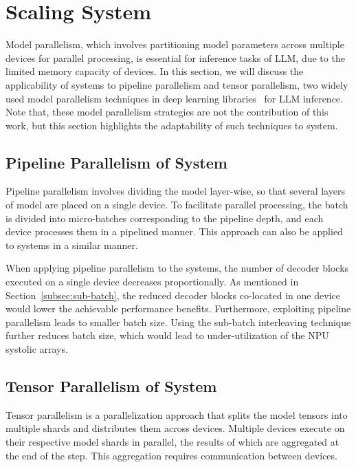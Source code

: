 
\section{Scaling \neupims System}
\label{sec:scale}

Model parallelism, which involves partitioning model parameters across multiple \neupims devices for parallel processing, is essential for inference tasks of LLM, due to the limited memory capacity of \neupims devices.
%
In this section, we will discuss the applicability of \neupims systems to pipeline parallelism and tensor parallelism, two widely used model parallelism techniques in deep learning libraries~\cite{megatronlm, tensorrt, tensorrt-llm} for LLM inference.
%
Note that, these model parallelism strategies are not the contribution of this work, but this section highlights the adaptability of such techniques to \neupims system.

\subsection{Pipeline Parallelism of \neupims System}
Pipeline parallelism involves dividing the model layer-wise, so that several layers of model are placed on a single \neupims device. 
%
To facilitate parallel processing, the batch is divided into micro-batches corresponding to the pipeline depth, and each device processes them in a pipelined manner. 
%
This approach can also be applied to \neupims systems in a similar manner.
%

%
When applying pipeline parallelism to the \neupims systems, the number of decoder blocks executed on a single \neupims device decreases proportionally. 
%
As mentioned in Section~\ref{subsec:sub-batch}, the reduced decoder blocks co-located in one \neupims device would lower the achievable performance benefits.
%
Furthermore, exploiting pipeline parallelism leads to smaller batch size.
%
Using the sub-batch interleaving technique further reduces batch size, which would lead to under-utilization of the NPU systolic arrays. 
%

%
\subsection{Tensor Parallelism of \neupims System}
%
Tensor parallelism is a parallelization approach that splits the model tensors into multiple shards and distributes them across devices.
%
Multiple devices execute on their respective model shards in parallel, the results of which are aggregated at the end of the step. 
%
This aggregation requires communication between devices.
%


